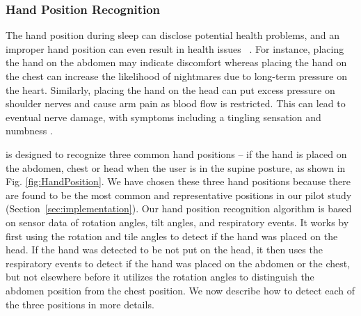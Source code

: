 \subsubsection{Hand Position Recognition\label{sec:handpr}}

The hand position during sleep can disclose potential health problems, and an improper hand position can even result in health issues~
\cite{position2014}. For instance, placing the hand on the abdomen may indicate discomfort whereas placing the hand on the chest can
increase the likelihood of nightmares due to long-term pressure on the heart. Similarly, placing the hand on the head can put excess
pressure on shoulder nerves and cause arm pain as blood flow is restricted. This can lead to eventual nerve damage, with symptoms including
a tingling sensation and numbness \cite{position2014}.


{\systemname} is designed to recognize three common hand positions -- if the hand is placed on the abdomen, chest or head when the user is
in the supine posture, as shown in Fig. \ref{fig:HandPosition}. We have chosen these three hand positions because there are found to be the
most common and representative positions in our pilot study (Section~\ref{sec:implementation}). Our hand position recognition algorithm is
based on sensor data of rotation angles, tilt angles, and respiratory events. It works by first using the rotation and tile angles to
detect if the hand was placed on the head. If the hand was detected to be not put on the head, it then uses the respiratory events to
detect if the hand was placed on the abdomen or the chest, but not elsewhere before it utilizes the rotation angles to distinguish the
abdomen position from the chest position. We now describe how to detect each of the three positions in more details.





